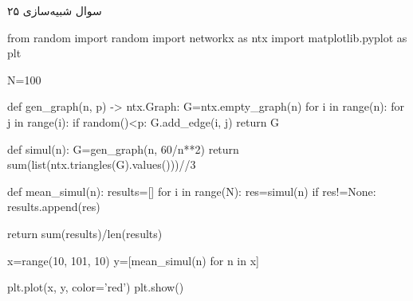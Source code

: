 سوال شبیه‌سازی ۲۵

\begin{latin}
\begin{python}
from random import random
import networkx as ntx
import matplotlib.pyplot as plt

N=100

def gen_graph(n, p) -> ntx.Graph:
	G=ntx.empty_graph(n)
	for i in range(n):
		for j in range(i):
			if random()<p:
				G.add_edge(i, j)
	return G

def simul(n):
	G=gen_graph(n, 60/n**2)
	return sum(list(ntx.triangles(G).values()))//3

def mean_simul(n):
	results=[]
	for i in range(N):
		res=simul(n)
		if res!=None:
			results.append(res)
	
	return sum(results)/len(results)

x=range(10, 101, 10)
y=[mean_simul(n) for n in x]

plt.plot(x, y, color='red')
plt.show()

\end{python}
\end{latin}